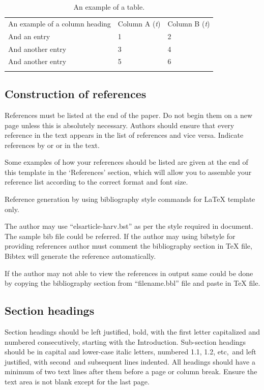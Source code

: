 \documentclass[3p,times,procedia]{elsarticle}
\begin{document}
\begin{table}[h]
\caption{An example of a table.}
\begin{tabular*}{\hsize}{@{\extracolsep{\fill}}lll@{}}
\toprule
An example of a column heading & Column A ({\it{t}}) & Column B ({\it{t}})\\
\colrule
And an entry &   1 &  2\\
And another entry  & 3 &  4\\
And another entry &  5 &  6\\
\botrule
\end{tabular*}
\end{table}


\subsection{ Construction of references}

References must be listed at the end of the paper. Do not begin them on a new page unless this is absolutely necessary. Authors should ensure that every reference in the text appears in the list of references and vice versa. Indicate references by \cite{clark} or \cite{Deal} or \cite{Fachinger2006} in the text. 

Some examples of how your references should be listed are given at the end of this template in the `References' section, which will allow you to assemble your reference list according to the correct format and font size.

Reference generation by using bibliography style commands for LaTeX template only.

The author may use ``elsarticle-harv.bst'' as per the style required in document. The sample bib file could be referred. 
If the author may using bibstyle for providing references author must comment the bibliography section in TeX file, Bibtex will generate the reference automatically.

If the author may not able to view the references in output same could be done by copying the bibliography section from ``filename.bbl'' file and paste in TeX file.



\subsection{Section headings}
Section headings should be left justified, bold, with the first letter capitalized and numbered consecutively, starting with the Introduction. Sub-section headings should be in capital and lower-case italic letters, numbered 1.1, 1.2, etc,~and left justified, with second~and subsequent lines indented. All headings should have a minimum of two text lines after them before a page or column break.
Ensure the text area is not blank except for the last page.
\end{document}
